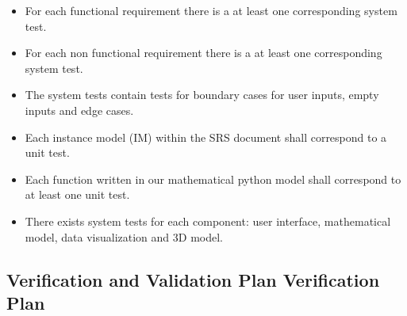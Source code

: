\documentclass[12pt, titlepage]{article}
\begin{document}
\begin{itemize}
  \item For each functional requirement there is a at least one corresponding system test.
  \item For each non functional requirement there is a at least one corresponding system test.  
  \item The system tests contain tests for boundary cases for user inputs, empty inputs and edge cases. 
  \item Each instance model (IM) within the SRS document shall correspond to a unit test. 
  \item Each function written in our mathematical python model shall correspond to at least one unit test. 
  \item There exists system tests for each component: user interface, mathematical model, data visualization and 3D model. 
\end{itemize}
\subsection{Verification and Validation Plan Verification Plan}
\end{document}
